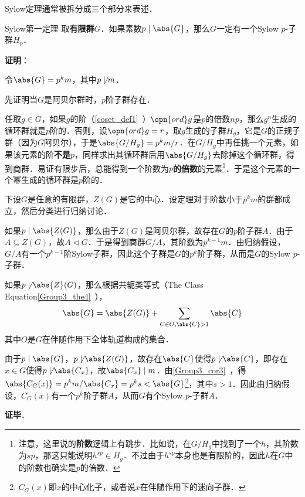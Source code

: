 Sylow定理通常被拆分成三个部分来表述．

\begin{theorem}{Sylow第一定理}
取\textbf{有限群}$G$．如果素数$p\mid\abs{G}$，那么$G$一定有一个Sylow $p$-子群$H_p$．
\end{theorem}

\textbf{证明}：

令$\abs{G}=p^km$，其中$p\not\mid m$．

先证明当$G$是阿贝尔群时，$p$阶子群存在．

任取$g\in G$，如果$g$的阶（\autoref{coset_def1}~）$\opn{ord}g$是$p$的倍数$np$，那么$g^n$生成的循环群就是$p$阶的．否则，设$\opn{ord}g=r$，取$g$生成的子群$H_g$，它是$G$的正规子群（因为$G$阿贝尔），于是$\abs{G/H_g}=p^km/r$．在$G/H_g$中再任挑一个元素，如果该元素的阶\textbf{不是}$p$，同样求出其循环群后用$\abs{G/H_g}$去除掉这个循环群，得到商群．易证有限步后，总能得到一个阶数为$p$\textbf{的倍数}的元素\footnote{注意，这里说的\textbf{阶数}逻辑上有跳步．比如说，在$G/H_g$中找到了一个$h$，其阶数为$sp$，那这只能说明$h^{sp}\in H_g$．不过由于$h^{sp}$本身也是有限阶的，因此$h$在$G$中的阶数也确实是$p$的倍数．}．于是这个元素的一个幂生成的循环群是$p$阶的．

下设$G$是任意的有限群，$Z(G)$是它的中心．设定理对于阶数小于$p^km$的群都成立，然后分类进行归纳讨论．

如果$p\mid \abs{Z(G)}$，那么由于$Z(G)$是阿贝尔群，故存在$G$的$p$阶子群$A$．由于$A\subseteq Z(G)$，故$A\vartriangleleft G$．于是得到商群$G/A$，其阶数为$p^{k-1}m$．由归纳假设，$G/A$有一个$p^{k-1}$阶Sylow子群，因此这个子群是$G$的$p^k$阶子群，从而是$G$的Sylow $p$-子群．

如果$p\not\mid \abs{Z}(G)$，那么根据共轭类等式（The Class Equation\autoref{Group3_the4}~），
\begin{equation}
\abs{G} = \abs{Z(G)} + \sum_{C\in O, \abs{C}>1} \abs{C}
\end{equation}
其中$O$是$G$在伴随作用下全体轨道构成的集合．

由于$p\mid \abs{G}$，$p\not\mid \abs{Z(G)}$，故存在$\abs{C}$使得$p\not\mid \abs{C}$，即存在$x\in G$使得$p\not\mid \abs{C_x}$，故$\abs{C_x}\mid m$．由\autoref{Group3_cor3}~，得$\abs{C_G(x)}=p^km/\abs{C_x}=p^ks<\abs{G}$\footnote{$C_G(x)$即$x$的中心化子，或者说$x$在伴随作用下的迷向子群．}，其中$s>1$．因此由归纳假设，$C_G(x)$有一个$p^k$阶子群$A$，从而$G$有个Sylow $p$-子群$A$．

\textbf{证毕}．





